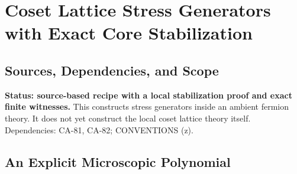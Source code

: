 
\section{Coset Lattice Stress Generators with Exact Core Stabilization}
\label{sec:coset-lattice-stress}

\subsection{Sources, Dependencies, and Scope}

\textbf{Status: source-based recipe with a local stabilization proof and
exact finite witnesses.} This constructs stress generators inside an
ambient fermion theory. It does not yet construct the local coset lattice
theory itself. Dependencies: CA-81, CA-82; CONVENTIONS (z).


\subsection{An Explicit Microscopic Polynomial}

